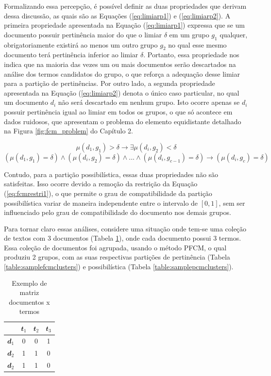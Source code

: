 Formalizando essa
percepção, é possível definir as duas propriedades que derivam dessa discussão, as quais são as
Equações (\ref{eq:limiarp1}) e (\ref{eq:limiarp2}). A primeira
propriedade  apresentada na Equação (\ref{eq:limiarp1}) expressa que se um documento possuir pertinência maior do
que o limiar $\delta$ em um grupo $g_1$ qualquer, obrigatoriamente existirá ao menos um outro grupo
$g_2$ no qual esse mesmo documento terá pertinência inferior ao limiar $\delta$. Portanto, essa
propriedade nos indica que na maioria das vezes um ou mais documentos serão descartados na análise
dos termos candidatos do grupo, o que reforça a adequação desse limiar para a partição de
pertinências. Por outro lado, a segunda
propriedade apresentada na Equação (\ref{eq:limiarp2}) denota o único caso particular, no qual um documento $d_i$
não será descartado em nenhum grupo. Isto ocorre apenas se $d_i$ possuir pertinência igual ao limiar em todos
os grupos, o que só acontece em dados ruidosos, que apresentam o problema do elemento equidistante
detalhado na Figura \ref{fig:fcm_problem} do Capítulo 2.

\begin{equation}
  \mu(d_1,g_1) > \delta \rightarrow \exists \mu(d_i, g_2) < \delta
  \label{eq:limiarp1}
\end{equation}
\begin{equation}
  ( \mu(d_1,g_1) = \delta ) \wedge ( \mu(d_i,g_2) = \delta ) \wedge ... \wedge ( \mu(d_i,g_{c-1}) =
  \delta ) \rightarrow ( \mu(d_i, g_c) = \delta  )
  \label{eq:limiarp2}
\end{equation}

Contudo, para a partição possibilística, essas duas propriedades não são satisfeitas. Isso ocorre
devido a remoção da restrição da Equação (\ref{eq:fcmrestri1}), o que permite o grau de
compatibilidade da partição possibilística variar de maneira independente entre o intervalo de
$[0,1]$, sem ser influenciado pelo grau de compatibilidade do documento nos demais grupos.

Para tornar claro essas análises, considere uma situação onde tem-se uma coleção de textos com
3 documentos (Tabela \ref{table:sampledocuments}), onde cada documento possui 3 termos. Essa coleção
de documentos foi agrupada, usando o método PFCM, o qual produziu 2 grupos, com as suas
respectivas partições de pertinência (Tabela
\ref{table:samplefcmclusters}) e possibilística (Tabela \ref{table:samplepcmclusters}).

\begin{table}[!htp]
  \centering
  \begin{tabular}{ |c|c|c|c|}
    \hline
    & $\mathbfit{t_1}$ & $\mathbfit{t_2}$ & $\mathbfit{t_3}$ \\
    \hline
    $\mathbfit{d_1}$ & 0 & 0 & 1 \\
    \hline
    $\mathbfit{d_2}$ & 1 & 1 & 0 \\
    \hline
    $\mathbfit{d_2}$ & 1 & 1 & 0 \\
    \hline
  \end{tabular}
  \caption{Exemplo de matriz documentos x termos}
  \label{table:sampledocuments}
\end{table}

